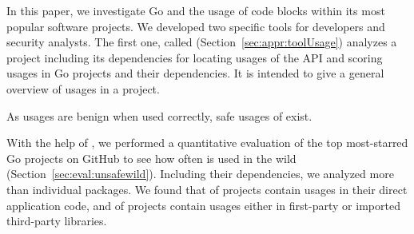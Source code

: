 In this paper, we investigate Go and the usage of \unsafe{} code blocks within its most popular software projects. 
We developed two specific tools for developers and security analysts.
The first one, called \toolUsage{} (Section~\ref{sec:appr:toolUsage}) analyzes a project including its dependencies for locating usages of the \unsafe{} API and scoring \unsafe{} usages in Go projects and their dependencies. 
It is intended to give a general overview of \unsafe{} usages in a project. %

As \unsafe{} usages are benign when used correctly, safe usages of \unsafe{} exist.

With the help of \toolUsage{}, we performed a quantitative evaluation of the top \initalProjs{} most-starred Go projects on GitHub to see how often \unsafe{} is used in the wild (Section~\ref{sec:eval:unsafewild}). 
Including their dependencies, we analyzed more than \packagesAnalyzedRounded{} individual packages. %
We found that \percentageProjectsWithUnsafe{} of projects contain \unsafe{} usages in their direct application code, and \percentageProjectsAndDependenciesUnsafe{} of
projects contain \unsafe{} usages either in first-party or imported third-party libraries.

